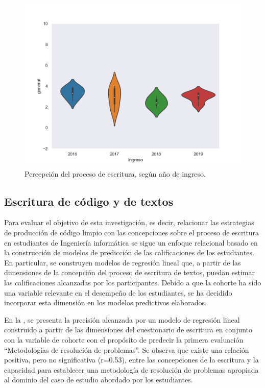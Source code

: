 \documentclass[spanish]{textolivre}
\begin{document}
\begin{figure}[H]
\centering
\begin{minipage}{.75\textwidth}
 \includegraphics[width=\textwidth]{figuras/figura6.png}
 \caption{Percepción del proceso de escritura, según año de ingreso.}
 \label{fig-percepcion}
\end{minipage}
\end{figure}

\subsection{Escritura de código y de textos}

Para evaluar el objetivo de esta investigación, es decir, relacionar las estrategias de producción de código limpio con las concepciones sobre el proceso de escritura en estudiantes de Ingeniería informática se sigue un enfoque relacional basado en la construcción de modelos de predicción de las calificaciones de los estudiantes. En particular, se construyen modelos de regresión lineal que, a partir de las dimensiones de la concepción del proceso de escritura de textos, puedan estimar las calificaciones alcanzadas por los participantes. Debido a que la cohorte ha sido una variable relevante en el desempeño de los estudiantes, se ha decidido incorporar esta dimensión en los modelos predictivos elaborados. 

En la , se presenta la precisión alcanzada por un modelo de regresión lineal construido a partir de las dimensiones del cuestionario de escritura en conjunto con la variable de cohorte con el propósito de predecir la primera evaluación “Metodologías de resolución de problemas”. Se observa que existe una relación positiva, pero no significativa (r=0.53), entre las concepciones de la escritura y la capacidad para establecer una metodología de resolución de problemas apropiada al dominio del caso de estudio abordado por los estudiantes. 
\end{document}
